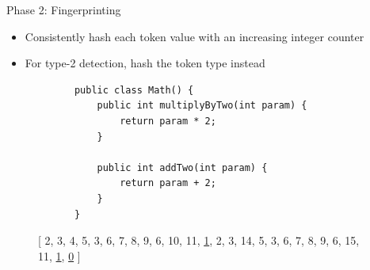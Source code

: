 \documentclass[aspectratio=1610, xcolor=table]{beamer}
\begin{document}
\begin{frame}[fragile]{Phase 2: Fingerprinting}
    \begin{itemize}
        \item Consistently hash each token value with an increasing integer counter
        \item For type-2 detection, hash the token type instead
    \end{itemize}
	\newsavebox{\firstlisting}
	\begin{lrbox}{\firstlisting}
        \begin{lstlisting}
            public class Math() {
                public int multiplyByTwo(int param) {
                    return param * 2;
                }

                public int addTwo(int param) {
                    return param + 2;
                }
            }
        \end{lstlisting}
	\end{lrbox}
	\begin{figure}
		\begin{center}
            \scalebox{.75}{\usebox{\firstlisting}}
                \hspace{.5cm}
            \vspace{.5cm}

            [ 2, 3, 4, 5, 3, 6, 7, 8, 9, 6, 10, 11, \underline{1}, 2, 3, 14, 5, 3, 6, 7,
                    8, 9, 6, 15, 11, \underline{1}, \underline{0} ]
		\end{center}
		\label{fig:fingerprint}
	\end{figure}
\end{frame}
\end{document}
